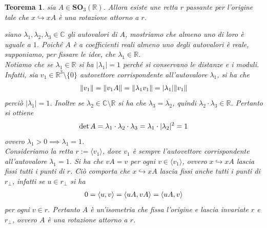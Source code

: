\documentclass[oneside, 11pt]{amsbook}
\makeatletter
\newcommand{\0}{{(0)}}
\newcommand{\3}{{(3)}}
\theoremstyle{colonplain}
\newtheorem{thm}{Teorema}[chapter]
\theoremstyle{colondefinition}
\theoremstyle{colonremark}
\numberwithin{equation}{chapter}
\renewcommand{\proofname}{Dimostrazione}
\renewenvironment{proof}[1][\proofname]{\par
  \pushQED{\qed}%
  \normalfont \topsep6\p@\@plus6\p@\relax
  \trivlist
  \item[\hskip\labelsep\bfseries #1:]\ignorespaces
}{%
  \popQED\endtrivlist\@endpefalse
}
\makeatother
\begin{document}
\begin{thm}\label{SOThreeRotations} sia $A \in \mathbf{SO}_3(\mathbb{R})$. Allora esiste une retta $r$ passante per l'origine tale che $x \hookrightarrow xA$ è una rotazione attorno a $r$. \\

\begin{proof} siano $\lambda_1, \lambda_2, \lambda_3 \in \mathbb{C}$ gli autovalori di $A$, mostriamo che almeno uno di loro è uguale a $1$. Poiché $A$ è a coefficienti reali almeno uno degli autovalori è reale, supponiamo, per fissare le idee, che $\lambda_1 \in \mathbb{R}$. \\
Notiamo che se $\lambda_1 \in \mathbb{R}$ si ha $|\lambda_1| = 1$ perché si conservano le distanze e i moduli. Infatti, sia $v_1 \in \mathbb{R}^3 \setminus \{ 0 \}$ autovettore corrispondente all'autovalore $\lambda_1$, si ha che
\begin{align}
    \| v_1 \| = \| v_1A \| = \| \lambda_1 v_1 \| = |\lambda_1|\| v_1 \| \notag
\end{align}
perciò $|\lambda_1| = 1$. Inoltre se $\lambda_2 \in \mathbb{C} \setminus \mathbb{R}$ si ha che $\lambda_3 = \overline{\lambda_2}$, quindi $\lambda_2 \cdot \lambda_3 \in \mathbb{R}$. Pertanto si ottiene
\begin{align}
    \det A = \lambda_1 \cdot \lambda_2 \cdot \lambda_3 = \lambda_1 \cdot |\lambda_2|^2 = 1 \notag
\end{align}
ovvero $\lambda_1 > 0 \implies \lambda_1 = 1$. \\
Consideriamo la retta $r := \langle v_1 \rangle$, dove $v_1$ è sempre l'autovettore corrispondente all'autovalore $\lambda_1 = 1$. Si ha che $vA = v$ per ogni $v \in \langle v_1 \rangle$, ovvero $x \hookrightarrow xA$ lascia fissi tutti i punti di $r$. Ciò comporta che $x \hookrightarrow xA$ lascia fissi anche tutti i punti di $r_\perp$, infatti se $u \in r_\perp$ si ha
\begin{align}
    0 = \langle u, v \rangle = \langle uA, vA \rangle = \langle uA, v \rangle \notag
\end{align}
per ogni $v \in r$. Pertanto $A$ è un'isometria che fissa l'origine e lascia invariate $r$ e $r_\perp$, ovvero $A$ è una rotazione attorno a $r$. \end{proof}
\end{thm}
\end{document}
